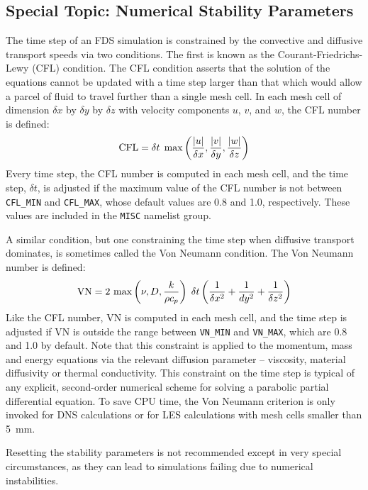 \documentclass[11pt]{book}
\newcommand{\ct}{\tt\small}
\newcommand{\dx}{\delta x}
\newcommand{\dy}{\delta y}
\newcommand{\dz}{\delta z}
\newcommand{\dt}{\delta t}
\newcommand{\hu}{u}
\newcommand{\hv}{v}
\newcommand{\hw}{w}
\newcommand{\be}{\begin{equation}}
\newcommand{\ee}{\end{equation}}
\begin{document}
\subsection{Special Topic: Numerical Stability Parameters}
\label{info:CFL}

The time step of an FDS simulation is constrained by the convective and diffusive
transport speeds via two conditions. The first is known as the
Courant-Friedrichs-Lewy (CFL) condition. The CFL condition asserts that the solution of the equations cannot be updated with a time step
larger than that which would allow a parcel of fluid to travel further than a single mesh cell.
In each mesh cell of dimension $\dx$ by $\dy$ by $\dz$ with velocity
components $u$, $v$, and $w$, the CFL number is defined:
\be \hbox{CFL} = \dt \; \max \left(\frac{|\hu|}{\dx},\frac{|\hv|}{\dy},\frac{|\hw|}{\dz} \right)   \label{cfl}
\ee
Every time step, the CFL number is computed in each mesh cell, and the time step, $\dt$, is adjusted if the
maximum value of the CFL number is not between {\ct CFL\_MIN} and {\ct CFL\_MAX}, whose default values are
0.8 and 1.0, respectively. These values are included in the {\ct MISC} namelist group.

A similar condition, but one constraining the time step when diffusive transport dominates, is sometimes called
the Von Neumann condition. The Von Neumann number is defined:
\be
\hbox{VN} = 2 \, \max \left( \nu , D , \frac{k}{\rho c_p} \right)  \; \dt  \left(\frac{1}{\dx^2}+\frac{1}{dy^2}+\frac{1}{\dz^2} \right)
\ee
Like the CFL number, VN is computed in each mesh cell, and the time step is adjusted if VN is outside the
range between {\ct VN\_MIN} and {\ct VN\_MAX}, which are 0.8 and 1.0 by default.
Note that this constraint is applied to the momentum, mass and energy equations via the
relevant diffusion parameter -- viscosity, material diffusivity or thermal conductivity.
This constraint on the time step is typical
of any explicit, second-order numerical scheme for solving a parabolic partial differential
equation. To save CPU time, the Von Neumann criterion is only invoked for DNS calculations or for LES
calculations with mesh cells smaller than 5~mm.

\begin{warning}
Resetting the stability parameters is not recommended except in very special circumstances, as they can lead to
simulations failing due to numerical instabilities.
\end{warning}


\clearpage
\end{document}
